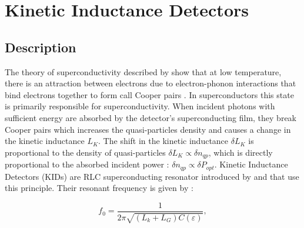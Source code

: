 
\section{Kinetic Inductance Detectors}
\label{se:kids}


%


\subsection{Description}

The theory of superconductivity described by \citep{PhysRev.108.1175} show that at low temperature, there is an attraction between electrons due to electron-phonon interactions that bind electrons together to form call Cooper pairs \citep{PhysRev.104.1189}. In superconductors this state is primarily responsible for superconductivity. When incident photons with sufficient energy are absorbed by the detector's superconducting film, they break Cooper pairs which increases the quasi-particles density and causes a change in the kinetic inductance $L_{K}$. The shift in the kinetic inductance $\delta L_{K}$ is proportional to the density of quasi-particles $\delta L_{K} \propto \delta n_{qp}$, which is directly proportional to the absorbed incident power : $\delta n_{qp} \propto \delta P_{opt}$.
Kinetic Inductance Detectors (KIDs) are RLC superconducting resonator introduced by \citep{2003Natur.425..817D} and that use this principle. Their resonant frequency is given by : 

\begin{equation}
f_{0} = \frac{1}{2\pi \sqrt{(L_{k}+L_{G})C(\varepsilon)}}, 
\end{equation}
 
